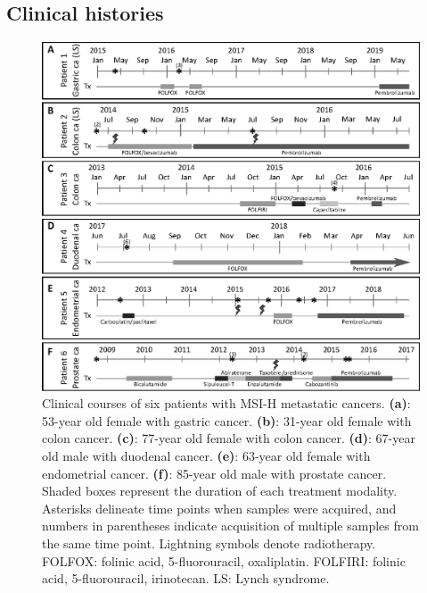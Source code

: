 \subsection{Clinical histories}
\label{ssec:msiclones:clinical_histories}
\begin{figure}[p]
	\begin{center}
		\includegraphics[width=0.94\linewidth]{images/msiclones/clinical_timelines}
	\end{center}
	\vspace{-0.4cm}
	\caption[Clinical courses of six patients with MSI-H metastatic cancers.]{Clinical courses of six patients with MSI-H metastatic cancers. \textbf{(a)}: 53-year old female with gastric cancer. \textbf{(b)}: 31-year old female with colon cancer. \textbf{(c)}: 77-year old female with colon cancer. \textbf{(d)}: 67-year old male with duodenal cancer. \textbf{(e)}: 63-year old female with endometrial cancer. \textbf{(f)}: 85-year old male with prostate cancer. Shaded boxes represent the duration of each treatment modality. Asterisks delineate time points when samples were acquired, and numbers in parentheses indicate acquisition of multiple samples from the same time point. Lightning symbols denote radiotherapy. FOLFOX: folinic acid, 5\nobreakdash-fluorouracil, oxaliplatin. FOLFIRI: folinic acid, 5\nobreakdash-fluorouracil, irinotecan. LS: Lynch syndrome.}
	\label{fig:msiclones:clinical_hx}
\end{figure}

